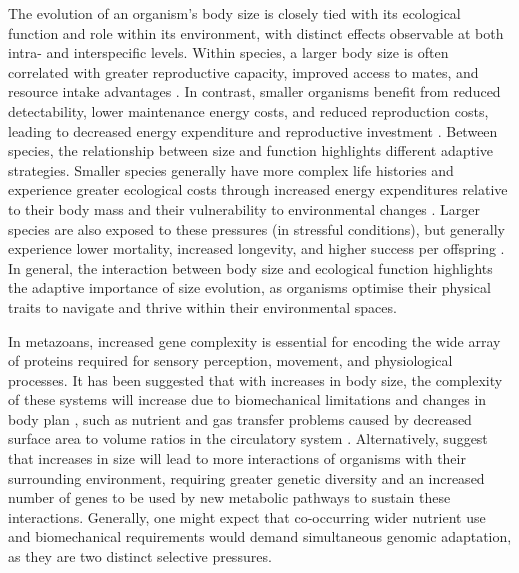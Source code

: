 \documentclass[11pt]{article}
\begin{document}
The evolution of an organism's body size is closely tied with its ecological function and role within its environment, with distinct effects observable at both intra- and interspecific levels. Within species, a larger body size is often correlated with greater reproductive capacity, improved access to mates, and resource intake advantages \citep{kemp2003lifetime}. In contrast, smaller organisms benefit from reduced detectability, lower maintenance energy costs, and reduced reproduction costs, leading to decreased energy expenditure and reproductive investment \citep{size-detectability, mass-life-history}. Between species, the relationship between size and function highlights different adaptive strategies. Smaller species generally have more complex life histories and experience greater ecological costs through increased energy expenditures relative to their body mass and their vulnerability to environmental changes \citep{large-small}. Larger species are also exposed to these pressures (in stressful conditions), but generally experience lower mortality, increased longevity, and higher success per offspring \citep{MTE, fast-slow}. In general, the interaction between body size and ecological function highlights the adaptive importance of size evolution, as organisms optimise their physical traits to navigate and thrive within their environmental spaces.

In metazoans, increased gene complexity is essential for encoding the wide array of proteins required for sensory perception, movement, and physiological processes. It has been suggested that with increases in body size, the complexity of these systems will increase due to biomechanical limitations \citep{system-scaling} and changes in body plan \citep{prok-to-human-complexity}, such as nutrient and gas transfer problems caused by decreased surface area to volume ratios in the circulatory system \citep{ruppert1983morphology}. Alternatively, \cite{DeLong} suggest that increases in size will lead to more interactions of organisms with their surrounding environment, requiring greater genetic diversity and an increased number of genes to be used by new metabolic pathways to sustain these interactions. Generally, one might expect that co-occurring wider nutrient use and biomechanical requirements would demand simultaneous genomic adaptation, as they are two distinct selective pressures.
\end{document}
